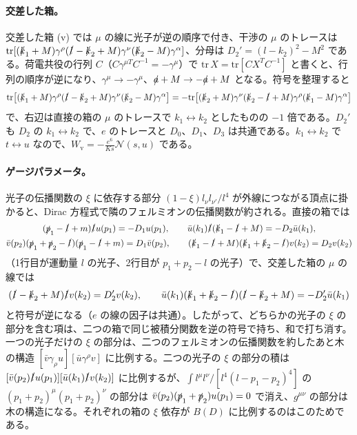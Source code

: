 \documentclass[a4paper,10pt]{ltjsarticle}
\begin{document}
\paragraph{交差した箱。}交差した箱 (v) では $\mu$ の線に光子が逆の順序で付き、干渉の $\mu$ のトレースは $\mathrm{tr}[(\slashed k_1+M)\gamma^\rho(\slashed l-\slashed k_2+M)\gamma^\nu(\slashed k_2-M)\gamma^\alpha]$、分母は $D_2'=(l-k_2)^2-M^2$ である。荷電共役の行列 $C$（$C\gamma^{\mu T}C^{-1}=-\gamma^\mu$）で $\mathrm{tr}\,X=\mathrm{tr}[CX^TC^{-1}]$ と書くと、行列の順序が逆になり、$\gamma^\mu\to-\gamma^\mu$、$\slashed a+M\to-\slashed a+M$ となる。符号を整理すると
\begin{equation*}
\mathrm{tr}\bigl[(\slashed k_1+M)\gamma^\rho(\slashed l-\slashed k_2+M)\gamma^\nu(\slashed k_2-M)\gamma^\alpha\bigr]
=-\mathrm{tr}\bigl[(\slashed k_2+M)\gamma^\nu(\slashed k_2-\slashed l+M)\gamma^\rho(\slashed k_1-M)\gamma^\alpha\bigr]
\end{equation*}
で、右辺は直接の箱の $\mu$ のトレースで $k_1\leftrightarrow k_2$ としたものの $-1$ 倍である。$D_2'$ も $D_2$ の $k_1\leftrightarrow k_2$ で、$e$ のトレースと $D_0$、$D_1$、$D_3$ は共通である。$k_1\leftrightarrow k_2$ で $t\leftrightarrow u$ なので、$W_{\mathrm v}=-\frac{e^6}{Ks}\mathcal N(s,u)$ である。

\paragraph{ゲージパラメータ。}光子の伝播関数の $\xi$ に依存する部分 $(1-\xi)l_\nu l_{\nu'}/l^4$ が外線につながる頂点に掛かると、Dirac 方程式で隣のフェルミオンの伝播関数が約される。直接の箱では
\begin{equation*}
\begin{gathered}
(\slashed p_1-\slashed l+m)\slashed lu(p_1)=-D_1u(p_1),\qquad \bar u(k_1)\slashed l(\slashed k_1-\slashed l+M)=-D_2\bar u(k_1),\\
\bar v(p_2)(\slashed p_1+\slashed p_2-\slashed l)(\slashed p_1-\slashed l+m)=D_1\bar v(p_2),\qquad (\slashed k_1-\slashed l+M)(\slashed k_1+\slashed k_2-\slashed l)v(k_2)=D_2v(k_2)
\end{gathered}
\end{equation*}
（1行目が運動量 $l$ の光子、2行目が $p_1+p_2-l$ の光子）で、交差した箱の $\mu$ の線では
\begin{equation*}
(\slashed l-\slashed k_2+M)\slashed lv(k_2)=D_2'v(k_2),\qquad \bar u(k_1)(\slashed k_1+\slashed k_2-\slashed l)(\slashed l-\slashed k_2+M)=-D_2'\bar u(k_1)
\end{equation*}
と符号が逆になる（$e$ の線の因子は共通）。したがって、どちらかの光子の $\xi$ の部分を含む項は、二つの箱で同じ被積分関数を逆の符号で持ち、和で打ち消す。一つの光子だけの $\xi$ の部分は、二つのフェルミオンの伝播関数を約したあと木の構造 $[\bar v\gamma_\rho u][\bar u\gamma^\rho v]$ に比例する。二つの光子の $\xi$ の部分の積は $[\bar v(p_2)\slashed lu(p_1)][\bar u(k_1)\slashed lv(k_2)]$ に比例するが、$\int l^\mu l^\nu/[l^4(l-p_1-p_2)^4]$ の $(p_1+p_2)^\mu(p_1+p_2)^\nu$ の部分は $\bar v(p_2)(\slashed p_1+\slashed p_2)u(p_1)=0$ で消え、$g^{\mu\nu}$ の部分は木の構造になる。それぞれの箱の $\xi$ 依存が $B(D)$ に比例するのはこのためである。
\end{document}
